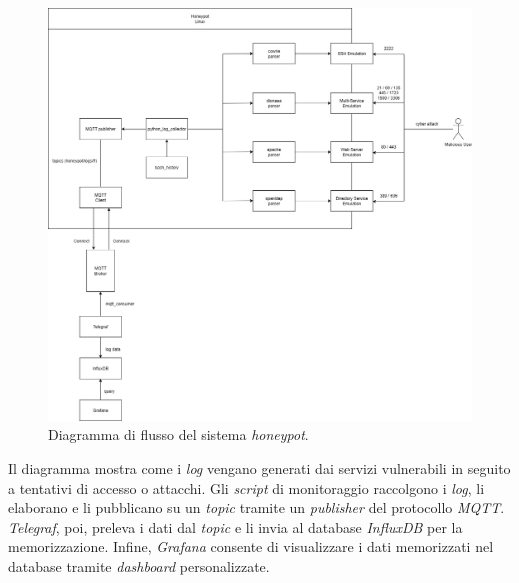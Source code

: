 \begin{figure}[H]
    \begin{center}
    \includegraphics[width=1.025\textwidth]{img/Diagramma-flusso.png}
    \caption{Diagramma di flusso del sistema \textit{honeypot}.}
    \label{fig:flowchart}
    \end{center}
\end{figure}
Il diagramma mostra come i \textit{log} vengano generati dai servizi vulnerabili in seguito a tentativi di accesso o attacchi.
Gli \textit{script} di monitoraggio raccolgono i \textit{log}, li elaborano e li pubblicano su un \textit{topic} tramite un \textit{publisher} del protocollo \textit{MQTT}.
\textit{Telegraf}, poi, preleva i dati dal \textit{topic} e li invia al database \textit{InfluxDB} per la memorizzazione.
Infine, \textit{Grafana} consente di visualizzare i dati memorizzati nel database tramite \textit{dashboard} personalizzate.
